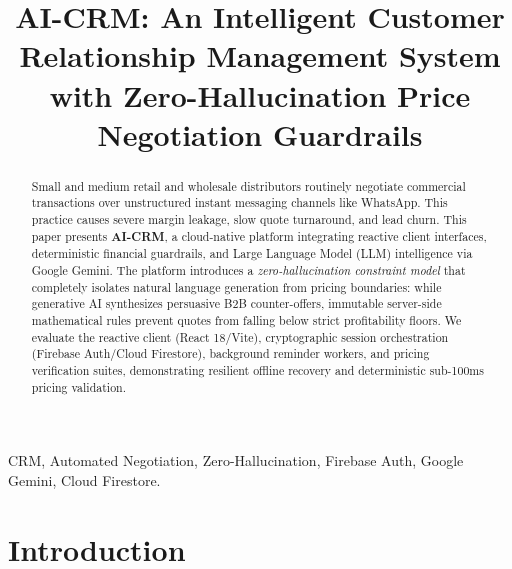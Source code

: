 \documentclass[conference]{IEEEtran}
\begin{document}
\title{AI-CRM: An Intelligent Customer Relationship Management System with Zero-Hallucination Price Negotiation Guardrails}

\author{
}

\maketitle

\begin{abstract}
Small and medium retail and wholesale distributors routinely negotiate commercial transactions over unstructured instant messaging channels like WhatsApp. This practice causes severe margin leakage, slow quote turnaround, and lead churn. This paper presents \textbf{AI-CRM}, a cloud-native platform integrating reactive client interfaces, deterministic financial guardrails, and Large Language Model (LLM) intelligence via Google Gemini. The platform introduces a \emph{zero-hallucination constraint model} that completely isolates natural language generation from pricing boundaries: while generative AI synthesizes persuasive B2B counter-offers, immutable server-side mathematical rules prevent quotes from falling below strict profitability floors. We evaluate the reactive client (React 18/Vite), cryptographic session orchestration (Firebase Auth/Cloud Firestore), background reminder workers, and pricing verification suites, demonstrating resilient offline recovery and deterministic sub-100ms pricing validation.
\end{abstract}

\begin{IEEEkeywords}
CRM, Automated Negotiation, Zero-Hallucination, Firebase Auth, Google Gemini, Cloud Firestore.
\end{IEEEkeywords}

\section{Introduction}
\label{sec:intro}
\end{document}
